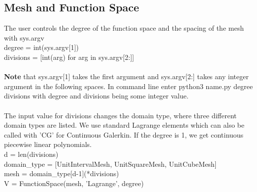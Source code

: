 \documentclass[12pt,3p]{article}
\begin{document}
\subsection{Mesh and Function Space}
The user controls the degree of the function space and the spacing of the mesh with {\selectfont sys.argv} \\
{\selectfont
degree = int(sys.argv[1]) \\
divisions = [int(arg) for arg in sys.argv[2:]] \\ \\
}
\textbf{Note} that {\selectfont sys.argv[1]} takes the first argument and {\selectfont sys.argv[2:]} takes any integer argument in the following spaces. In command line enter {\selectfont python3 name.py degree divisions} with degree and divisions being some integer value. \\ \\
The input value for divisions changes the domain type, where three different domain types are listed.  We use standard Lagrange elements which can also be called with {\selectfont 'CG'} for Continuous Galerkin. If the degree is 1, we get continuous piecewise linear polynomials. \\
{\selectfont
d = len(divisions) \\
domain\_type = [UnitIntervalMesh, UnitSquareMesh, UnitCubeMesh] \\
mesh = domain\_type[d-1](*divisions) \\
V = FunctionSpace(mesh, 'Lagrange', degree) \\ \\
}
\end{document}
